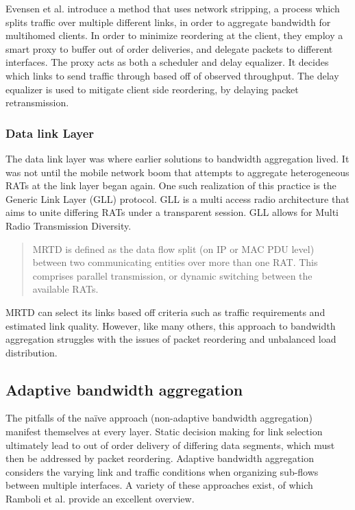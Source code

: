 \documentclass[12pt]{article}
\begin{document}
		Evensen et al. introduce a method that uses network stripping, a process which splits traffic over multiple different links, in order to aggregate bandwidth for multihomed clients. In order to minimize reordering at the client, they employ a smart proxy to buffer out of order deliveries, and delegate packets to different interfaces. The proxy acts as both a scheduler and delay equalizer. It decides which links to send traffic through based off of observed throughput. The delay equalizer is used to mitigate client side reordering, by delaying packet retransmission\cite{5355198}.

	\subsubsection{Data link Layer}
		The data link layer was where earlier solutions to bandwidth aggregation lived. It was not until the mobile network boom that attempts to aggregate heterogeneous RATs at the link layer began again. One such realization of this practice is the Generic Link Layer (GLL) protocol. GLL is a multi access radio architecture that aims to unite differing RATs under a transparent session. GLL allows for Multi Radio Transmission Diversity.
		\begin{quote}
			MRTD is defined as the data flow split (on IP or MAC PDU level) between two communicating entities over more than one RAT. This comprises parallel transmission, or dynamic switching between the available RATs.\cite{GLL:2005}
		\end{quote}
		MRTD can select its links based off criteria such as traffic requirements and estimated link quality. However, like many others, this approach to bandwidth aggregation struggles with the issues of packet reordering and unbalanced load distribution\cite{Ramaboli20121674}.

\subsection{Adaptive bandwidth aggregation}

	The pitfalls of the na\"{i}ve approach (non-adaptive bandwidth aggregation) manifest themselves at every layer. Static decision making for link selection ultimately lead to out of order delivery of differing data segments, which must then be addressed by packet reordering. Adaptive bandwidth aggregation considers the varying link and traffic conditions when organizing sub-flows between multiple interfaces. A variety of these approaches exist, of which Ramboli et al. provide an excellent overview. 
\end{document}
